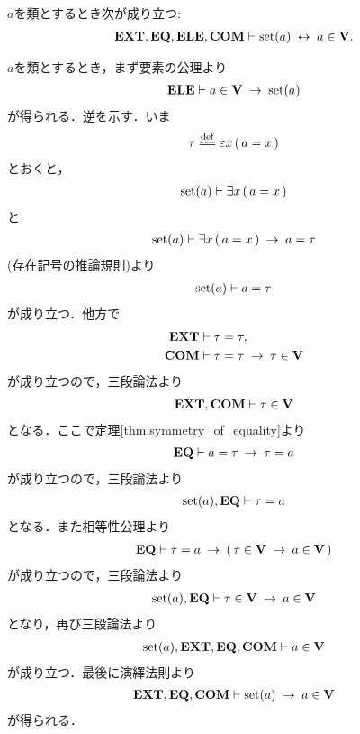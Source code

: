 	\begin{screen}
		\begin{thm}
		\label{thm:V_is_the_whole_of_sets}
			$a$を類とするとき次が成り立つ:
			\begin{align}
				\mbox{{\bf EXT}},\mbox{{\bf EQ}},\mbox{{\bf ELE}},\mbox{\bf COM} \vdash \operatorname*{set} (a) \hspace{0.25em}\leftrightarrow\hspace{0.25em} a \in \mathbf{V}.
			\end{align}
		\end{thm}
	\end{screen}
	
	\begin{prf}
		$a$を類とするとき，まず要素の公理より
		\begin{align}
			\mbox{{\bf ELE}} \vdash a \in \mathbf{V} \hspace{0.25em}\rightarrow\hspace{0.25em} \operatorname*{set} (a)
		\end{align}
		が得られる．逆を示す．いま
		\begin{align}
			\tau \defeq \varepsilon x\, (\, a = x\, )
		\end{align}
		とおくと，
		\begin{align}
			\operatorname*{set} (a) \vdash \exists x\, (\, a = x\, )
		\end{align}
		と
		\begin{align}
			\operatorname*{set} (a) \vdash \exists x\, (\, a = x\, ) \hspace{0.25em}\rightarrow\hspace{0.25em} a = \tau
		\end{align}
		(存在記号の推論規則)より
		\begin{align}
			\operatorname*{set} (a) \vdash a = \tau
		\end{align}
		が成り立つ．他方で
		\begin{align}
			\mbox{{\bf EXT}} &\vdash \tau = \tau, \\
			\mbox{\bf COM} &\vdash \tau = \tau \hspace{0.25em}\rightarrow\hspace{0.25em} \tau \in \mathbf{V}
		\end{align}
		が成り立つので，三段論法より
		\begin{align}
			\mbox{{\bf EXT}},\mbox{\bf COM} \vdash \tau \in \mathbf{V}
		\end{align}
		となる．ここで定理\ref{thm:symmetry_of_equality}より
		\begin{align}
			\mbox{{\bf EQ}} \vdash a = \tau \hspace{0.25em}\rightarrow\hspace{0.25em} \tau = a
		\end{align}
		が成り立つので，三段論法より
		\begin{align}
			\operatorname*{set} (a),\mbox{{\bf EQ}} \vdash \tau = a
		\end{align}
		となる．また相等性公理より
		\begin{align}
			\mbox{{\bf EQ}} \vdash \tau = a \hspace{0.25em}\rightarrow\hspace{0.25em} (\, \tau \in \mathbf{V} \hspace{0.25em}\rightarrow\hspace{0.25em} a \in \mathbf{V}\, )
		\end{align}
		が成り立つので，三段論法より
		\begin{align}
			\operatorname*{set} (a),\mbox{{\bf EQ}} \vdash \tau \in \mathbf{V} \hspace{0.25em}\rightarrow\hspace{0.25em} a \in \mathbf{V}
		\end{align}
		となり，再び三段論法より
		\begin{align}
			\operatorname*{set} (a),\mbox{{\bf EXT}},\mbox{{\bf EQ}},\mbox{\bf COM} \vdash a \in \mathbf{V}
		\end{align}
		が成り立つ．最後に演繹法則より
		\begin{align}
			\mbox{{\bf EXT}},\mbox{{\bf EQ}},\mbox{\bf COM} \vdash \operatorname*{set} (a) \hspace{0.25em}\rightarrow\hspace{0.25em} a \in \mathbf{V}
		\end{align}
		が得られる．
		\QED
	\end{prf}
	

